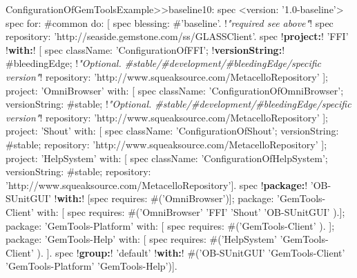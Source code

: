 \documentclass[a4paper,10pt,twoside]{book}
\begin{document}
\begin{footnotesize}
\begin{code}{}
ConfigurationOfGemToolsExample>>baseline10: spec
  <version: '1.0-baseline'>
  spec for: #common do: [
     spec blessing: #'baseline'.                 !\emph{"required see above"}!
     spec repository: 'http://seaside.gemstone.com/ss/GLASSClient'.
     spec
        !\textbf{project:}! 'FFI' !\textbf{with:}! [
          spec
             className: 'ConfigurationOfFFI';
             !\textbf{versionString:}! #bleedingEdge;					!\emph{"Optional. \#stable/\#development/\#bleedingEdge/specific version"}!
             repository: 'http://www.squeaksource.com/MetacelloRepository' ];
        project: 'OmniBrowser' with: [
          spec
             className: 'ConfigurationOfOmniBrowser';
             versionString: #stable;									!\emph{"Optional. \#stable/\#development/\#bleedingEdge/specific version"}!
             repository: 'http://www.squeaksource.com/MetacelloRepository' ];
        project: 'Shout' with: [
          spec
             className: 'ConfigurationOfShout';
             versionString: #stable;
             repository: 'http://www.squeaksource.com/MetacelloRepository' ];
        project: 'HelpSystem' with: [
          spec
             className: 'ConfigurationOfHelpSystem';
             versionString: #stable;
             repository: 'http://www.squeaksource.com/MetacelloRepository'].
     spec
        !\textbf{package:}! 'OB-SUnitGUI' !\textbf{with:}! [spec requires: #('OmniBrowser')];
        package: 'GemTools-Client' with: [ spec requires: #('OmniBrowser' 'FFI' 'Shout' 'OB-SUnitGUI' ).];
        package: 'GemTools-Platform' with: [ spec requires: #('GemTools-Client' ). ];
        package: 'GemTools-Help' with: [
          spec requires: #('HelpSystem' 'GemTools-Client' ). ].
     spec !\textbf{group:}! 'default' !\textbf{with:}! #('OB-SUnitGUI' 'GemTools-Client' 'GemTools-Platform' 'GemTools-Help')].
\end{code}         
\end{footnotesize} 
\end{document}
